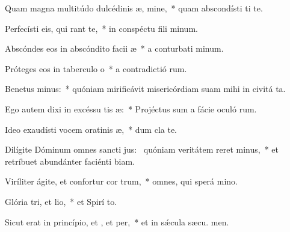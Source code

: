 \item Quam magna multitúdo dulcédinis æ, mine,~* quam abscondísti ti te.
\item Perfecísti eis, qui rant  te,~* in conspéctu fili minum.
\item Abscóndes eos in abscóndito facii æ~* a conturbati minum.
\item Próteges eos in taberculo o~* a contradictió rum.
\item Benetus minus:~* quóniam mirificávit misericórdiam suam mihi in civitá ta.
\item Ego autem dixi in excéssu tis æ:~* Projéctus sum a fácie oculó rum.
\item Ideo exaudísti vocem oratinis æ,~* dum cla  te.
\item Dilígite Dóminum omnes sancti jus:~\pscross{} quóniam veritátem reret minus,~* et retríbuet abundánter faciénti biam.
\item Viríliter ágite, et confortur cor trum,~* omnes, qui sperá  mino.
\item Glória tri, et lio,~* et Spirí to.
\item Sicut erat in princípio, et , et per,~* et in sǽcula sæcu. men.
